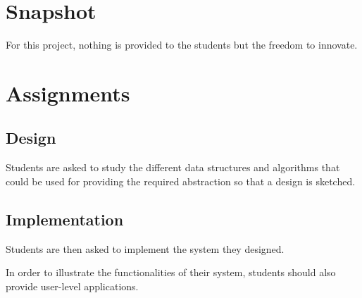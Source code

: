 %
%

\section{Snapshot}

For this project, nothing is provided to the students but the freedom to
innovate.

%
%

\section{Assignments}


\subsection*{Design}

Students are asked to study the different data structures and algorithms
that could be used for providing the required abstraction so that
a design is sketched.


\subsection*{Implementation}

Students are then asked to implement the system they designed.

In order to illustrate the functionalities of their system, students
should also provide user-level applications.
